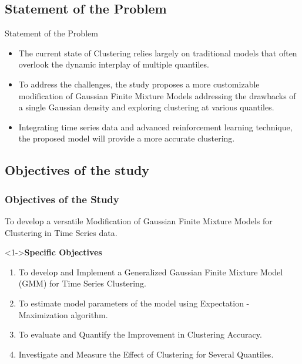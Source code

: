 \documentclass[unknownkeysallowed]{beamer}
\begin{document}
\subsection{Statement of the Problem}
\begin{frame}{Statement of the Problem}
	\begin{itemize}
		\item The current state of Clustering relies largely on traditional models that often overlook the dynamic interplay of multiple quantiles. 
		
		\item To address the challenges, the study proposes a more customizable modification of Gaussian Finite Mixture Models addressing the drawbacks of a single Gaussian density and exploring clustering at various quantiles.
		
		\item Integrating time series data and advanced reinforcement learning technique, the proposed model will provide a more accurate clustering. 
	\end{itemize}
	
	
\end{frame}

\subsection{Objectives of the study}
\begin{frame}
	\frametitle{\textbf{Objectives of the Study}}
	To develop a versatile Modification of Gaussian Finite Mixture Models for Clustering in Time Series data.
	\begin{exampleblock}
		<1->{\textbf{Specific Objectives}}
	\end{exampleblock}
	\begin{enumerate}
		\item To develop and Implement a Generalized Gaussian Finite Mixture Model (GMM) for Time Series Clustering.
		\item To estimate model parameters of the model using Expectation - Maximization algorithm.
		\item To evaluate and Quantify the Improvement in Clustering Accuracy.
		\item Investigate and Measure the Effect of Clustering for Several Quantiles.
	\end{enumerate}
\end{frame}
\end{document}
